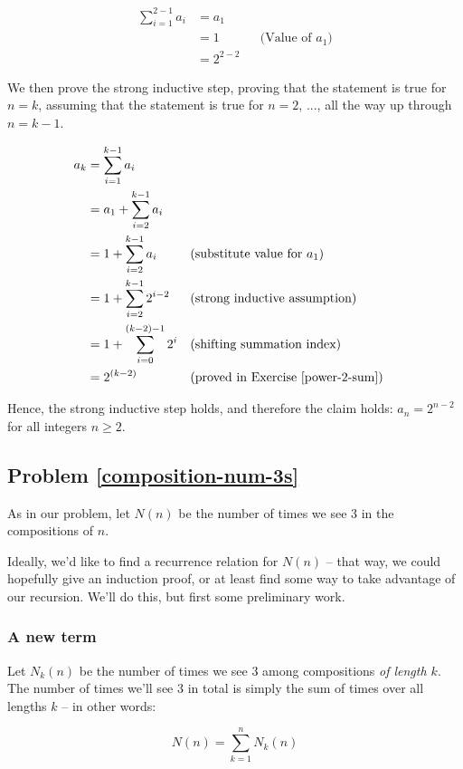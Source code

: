 \begin{align*}
\sum_{i=1}^{2-1} a_i &= a_1 \\
&= 1 && \text{(Value of $a_1$)} \\
&= 2^{2-2}
\end{align*}

We then prove the strong inductive step, proving that the statement is true for $n = k$, assuming that the statement is true for $n = 2$, ..., all the way up through $n = k - 1$.

\begin{align*}
a_k &= \sum_{i=1}^{k-1} a_i \\
&= a_1 + \sum_{i=2}^{k-1} a_i \\
&= 1 + \sum_{i=2}^{k-1} a_i && \text{(substitute value for $a_1$)} \\
&= 1 + \sum_{i=2}^{k-1} 2^{i-2} && \text{(strong inductive assumption)} \\
&= 1 + \sum_{i=0}^{(k-2)-1} 2^i && \text{(shifting summation index)} \\
&= 2^{(k-2)} && \text{(proved in Exercise \ref{power-2-sum})}
\end{align*}

Hence, the strong inductive step holds, and therefore the claim holds: $a_n = 2^{n-2}$ for all integers $n \geq 2$. 


\subsection{Problem \ref{composition-num-3s}}

As in our problem, let $N(n)$ be the number of times we see 3 in the compositions of $n$. 

Ideally, we'd like to find a recurrence relation for $N(n)$ -- that way, we could hopefully give an induction proof, or at least find some way to take advantage of our recursion. We'll do this, but first some preliminary work.

\subsubsection{A new term}

Let $N_k(n)$ be the number of times we see 3 among compositions \emph{of length $k$}. The number of times we'll see 3 in total is simply the sum of times over all lengths $k$ -- in other words:

\begin{equation*}
N(n) = \sum_{k=1}^{n} N_k(n)
\end{equation*}

